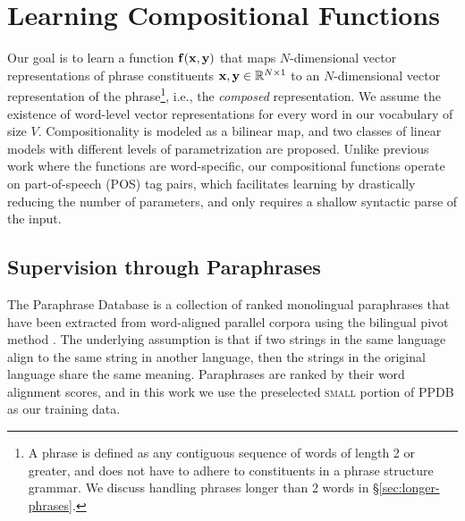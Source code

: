 \documentclass[11pt,letterpaper]{article}
\newcommand{\bX}{{\bf x}}
\newcommand{\bY}{{\bf y}}
\newcommand{\bF}{{\bf f}}
\begin{document}
\section{Learning Compositional Functions}
\label{sec:learning}

Our goal is to learn a function $\bF (\bX, \bY)$ that maps $N$-dimensional vector representations of phrase constituents $\bX, \bY \in \mathbb{R}^{N \times 1}$  to an $N$-dimensional vector representation of the phrase\footnote{A phrase is defined as any contiguous sequence of words of length 2 or greater, and does not have to adhere to constituents in a phrase structure grammar. We discuss handling phrases longer than 2 words in \S\ref{sec:longer-phrases}.}, i.e., the \emph{composed} representation. 
We assume the existence of word-level vector representations for every word in our vocabulary of size $V$.
Compositionality is modeled as a bilinear map, and two classes of linear models with different levels of parametrization are proposed.  
Unlike previous work \cite[\emph{inter alia}]{Baroni2010,Socher2012,Grefenstette2013} where the functions are  word-specific, our compositional functions operate on part-of-speech (POS) tag pairs, which facilitates learning by drastically reducing the number of parameters, and only requires a shallow syntactic parse of the input. 

\subsection{Supervision through Paraphrases}
\label{sec:ppdb}

The Paraphrase Database \cite[PPDB]{Ganitkevich2013} is a collection of ranked monolingual paraphrases that have been extracted from word-aligned parallel corpora using the bilingual pivot method \cite{Bannard2005}. 
The underlying assumption is that if two strings in the same language align to the same string in another language, then the strings in the original language share the same meaning. 
Paraphrases are ranked by their word alignment scores, and in this work we use the preselected \textsc{small} portion of PPDB as our training data.%
\end{document}
